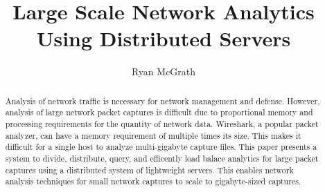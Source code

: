 \documentclass{article}
\begin{document}
\title{Large Scale Network Analytics Using Distributed Servers}
\author{Ryan McGrath}
\maketitle

\begin{abstract}

  Analysis of network traffic is necessary for network management and defense. However, analysis of large network packet captures is difficult due to proportional memory and processing requirements for the quantity of network data. Wireshark, a popular packet analyzer, can have a memory requirement of multiple times its size. This makes it difficult for a single host to analyze multi-gigabyte capture files.  This paper presents a system to divide, distribute, query, and efficently load balace analytics for large packet captures using a distributed system of lightweight servers. This enables network analysis techniques for small network captures to scale to gigabyte-sized captures.


\end{abstract}
\end{document}
